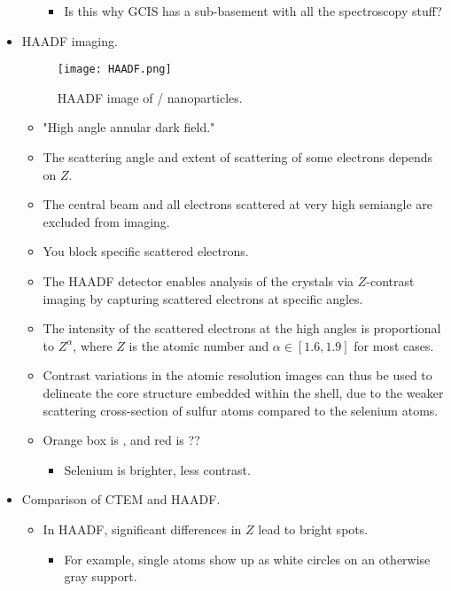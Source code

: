 \documentclass[../notes.tex]{subfiles}
\begin{document}
\begin{itemize}
\begin{itemize}
        \begin{itemize}
            \item Is this why GCIS has a sub-basement with all the spectroscopy stuff?
        \end{itemize}
    \end{itemize}
    \item HAADF imaging.
    \begin{figure}[h!]
        \centering
        \texttt{[image: HAADF.png]}
        \caption{HAADF image of / nanoparticles.}
        \label{fig:HAADF}
    \end{figure}
    \begin{itemize}
        \item "High angle annular dark field."
        \item The scattering angle and extent of scattering of some electrons depends on $Z$.
        \item The central beam and all electrons scattered at very high semiangle are excluded from imaging.
        \item You block specific scattered electrons.
        \item The HAADF detector enables analysis of the crystals via $Z$-contrast imaging by capturing scattered electrons at specific angles.
        \item The intensity of the scattered electrons at the high angles is proportional to $Z^\alpha$, where $Z$ is the atomic number and $\alpha\in[1.6,1.9]$ for most cases.
        \item Contrast variations in the atomic resolution images can thus be used to delineate the  core structure embedded within the  shell, due to the weaker scattering cross-section of sulfur atoms compared to the selenium atoms.
        \item Orange box is , and red is ??
        \begin{itemize}
            \item Selenium is brighter, less contrast.
        \end{itemize}
    \end{itemize}
    \item Comparison of CTEM and HAADF.
    \begin{itemize}
        \item In HAADF, significant differences in $Z$ lead to bright spots.
        \begin{itemize}
            \item For example, single  atoms show up as white circles on an otherwise gray  support.

\end{itemize}
\end{itemize}
\end{itemize}
\end{document}
